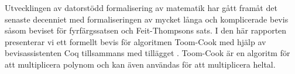 Utvecklingen av datorstödd formalisering av matematik har gått framåt det
senaste decenniet med formaliseringen av mycket långa och komplicerade bevis
såsom beviset för fyrfärgssatsen och Feit-Thompsons sats. I den här rapporten
presenterar vi ett formellt bevis för algoritmen Toom-Cook med hjälp av
bevisassistenten Coq tillsammans med tillägget \ssr. Toom-Cook är en algoritm
för att multiplicera polynom och kan även användas för att multiplicera heltal.

